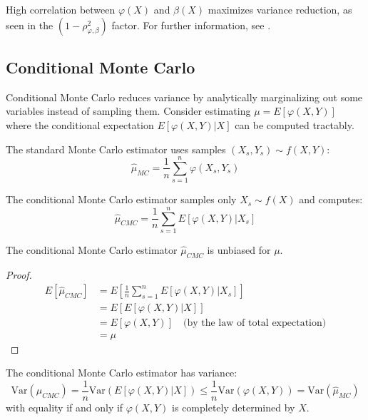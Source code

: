 High correlation between $\varphi(X)$ and $\beta(X)$ maximizes variance reduction, as seen in the $(1 - \rho_{\varphi,\beta}^2)$ factor. For further information, see \cite{murphy_probabilistic_2023, lemieux_monte_2009}.

\subsection{Conditional Monte Carlo}
\label{Rao-B}

Conditional Monte Carlo reduces variance by analytically marginalizing out some variables instead of sampling them. Consider estimating $\mu = E[\varphi(X,Y)]$ where the conditional expectation $E[\varphi(X,Y)|X]$ can be computed tractably.

The standard Monte Carlo estimator uses samples $(X_s, Y_s) \sim f(X,Y)$:
\begin{equation}
\hat{\mu}_{MC} = \frac{1}{n}\sum_{s=1}^n \varphi(X_s, Y_s)
\end{equation}

The conditional Monte Carlo estimator samples only $X_s \sim f(X)$ and computes:
\begin{equation}
\hat{\mu}_{CMC} = \frac{1}{n}\sum_{s=1}^n E[\varphi(X,Y)|X_s]
\end{equation}

\begin{theoremrep}
The conditional Monte Carlo estimator $\hat{\mu}_{CMC}$ is unbiased for $\mu$.
\end{theoremrep}

\begin{proof}
\begin{align*}
E[\hat{\mu}_{CMC}] &= E\left[\frac{1}{n}\sum_{s=1}^n E[\varphi(X,Y)|X_s]\right]\\
&= E[E[\varphi(X,Y)|X]]\\
&= E[\varphi(X,Y)] \quad \text{(by the law of total expectation)}\\
&= \mu
\end{align*}
\end{proof}

\begin{theoremrep}
The conditional Monte Carlo estimator has variance:
\begin{equation}
\text{Var}(\hat{\mu}_{CMC}) = \frac{1}{n}\text{Var}(E[\varphi(X,Y)|X]) \leq \frac{1}{n}\text{Var}(\varphi(X,Y)) = \text{Var}(\hat{\mu}_{MC})
\end{equation}
with equality if and only if $\varphi(X,Y)$ is completely determined by $X$.
\end{theoremrep}

